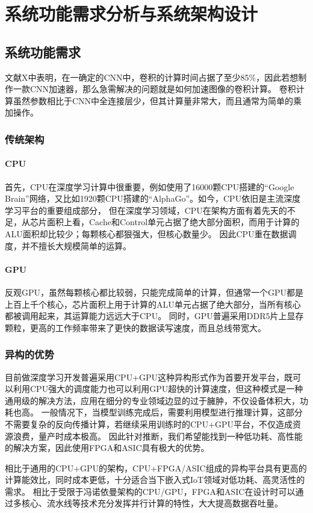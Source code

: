 \chapter{系统功能需求分析与系统架构设计}

\section{系统功能需求}
文献X中表明，在一确定的CNN中，卷积的计算时间占据了至少85\%，因此若想制作一款CNN加速器，那么急需解决的问题就是如何加速图像的卷积计算。
卷积计算虽然参数相比于CNN中全连接层少，但其计算量非常大，而且通常为简单的乘加操作。
    \subsection{传统架构}
        \subsubsection{CPU}
        首先，CPU在深度学习计算中很重要，例如使用了16000颗CPU搭建的“Google Brain”网络，又比如1920颗CPU搭建的“AlphaGo”。如今，CPU依旧是主流深度学习平台的重要组成部分，
        但在深度学习领域，CPU在架构方面有着先天的不足，从芯片面积上看，Cache和Control单元占据了绝大部分面积，而用于计算的ALU面积却比较少；每颗核心都狠强大，但核心数量少。
        因此CPU重在数据调度，并不擅长大规模简单的运算。
        \subsubsection{GPU}
        反观GPU，虽然每颗核心都比较弱，只能完成简单的计算，但通常一个GPU都是上百上千个核心，芯片面积上用于计算的ALU单元占据了绝大部分，当所有核心都被调用起来，其运算能力远远大于CPU。
        同时，GPU普遍采用DDR5片上显存颗粒，更高的工作频率带来了更快的数据读写速度，而且总线带宽大。
    \subsection{异构的优势}
        目前做深度学习开发普遍采用CPU+GPU这种异构形式作为首要开发平台，既可以利用CPU强大的调度能力也可以利用GPU超快的计算速度，但这种模式是一种通用级的解决方法，应用在细分的专业领域边显的过于臃肿，不仅设备体积大，功耗也高。
        一般情况下，当模型训练完成后，需要利用模型进行推理计算，这部分不需要复杂的反向传播计算，若继续采用训练时的CPU+GPU平台，不仅造成资源浪费，量产时成本极高。
        因此针对推断，我们希望能找到一种低功耗、高性能的解决方案，因此使用FPGA和ASIC具有极大的优势。

        相比于通用的CPU+GPU的架构，CPU+FPGA/ASIC组成的异构平台具有更高的计算能效比，同时成本更低，十分适合当下嵌入式IoT领域对低功耗、高灵活性的需求。
        相比于受限于冯诺依曼架构的CPU/GPU，FPGA和ASIC在设计时可以通过多核心、流水线等技术充分发挥并行计算的特性，大大提高数据吞吐量。

